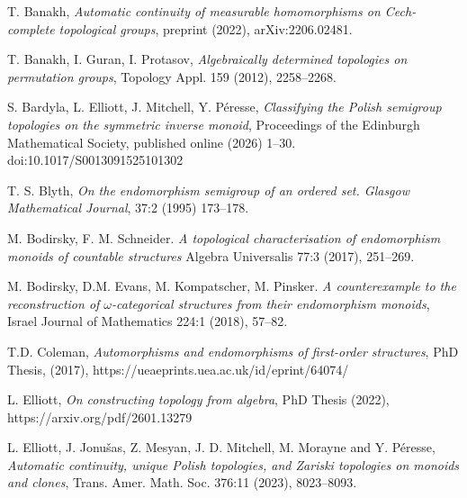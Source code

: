 \documentclass[11pt]{amsart}
\theoremstyle{definition}
\begin{document}
\begin{thebibliography}{}



T. Banakh, {\em Automatic continuity of measurable homomorphisms on Cech-complete topological groups}, preprint (2022), arXiv:2206.02481.

T. Banakh, I. Guran, I. Protasov, {\em Algebraically determined topologies on permutation groups}, Topology Appl. 159 (2012), 2258--2268.

S. Bardyla, L. Elliott, J. Mitchell,  Y. P\'{e}resse, {\em Classifying the Polish semigroup topologies on the symmetric inverse monoid}, Proceedings of the Edinburgh Mathematical Society, published online (2026) 1--30. doi:10.1017/S0013091525101302




 T. S. Blyth, {\em On the endomorphism semigroup of an ordered set. Glasgow Mathematical Journal}, 37:2 (1995) 173--178.

M. Bodirsky, F. M. Schneider. {\em A topological characterisation of endomorphism monoids of countable structures} Algebra Universalis 77:3 (2017), 251--269.

M. Bodirsky, D.M. Evans, M. Kompatscher, M. Pinsker. {\em A counterexample to the reconstruction of $\omega$-categorical structures from their endomorphism monoids}, Israel Journal of Mathematics 224:1 (2018), 57--82.
    

T.D. Coleman, {\em Automorphisms and endomorphisms of first-order structures}, PhD Thesis, (2017), https://ueaeprints.uea.ac.uk/id/eprint/64074/

L. Elliott, {\em On constructing topology from algebra}, PhD Thesis (2022), https://arxiv.org/pdf/2601.13279

L. Elliott, J. Jonu\v{s}as, Z. Mesyan, J. D. Mitchell, M. Morayne and Y. P\'eresse,  {\em Automatic continuity, unique Polish topologies, and Zariski topologies on monoids and clones}, Trans. Amer. Math. Soc. 376:11 (2023), 8023--8093.



\end{thebibliography}
\end{document}
